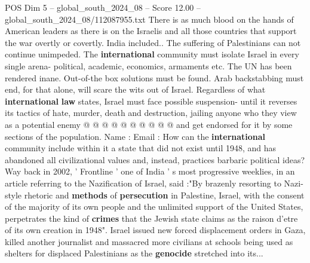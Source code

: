 \begin{textsample}{POS Dim 5 – global\_south\_2024\_08 – Score 12.00 – global\_south\_2024\_08/112087955.txt}
There is as much blood on the hands of American leaders as there is on the Israelis and all those countries that support the war overtly or covertly.
India included..
The suffering of Palestinians can not continue unimpeded.
The \textbf{international} community must isolate Israel in every single arena- political, academic, economics, armaments etc.
The UN has been rendered inane.
Out-of-the box solutions must be found.
Arab backstabbing must end, for that alone, will scare the wits out of Israel.
Regardless of what \textbf{international} \textbf{law} states, Israel must face possible suspension- until it reverses its tactics of hate, murder, death and destruction, jailing anyone who they view as a potential enemy @ @ @ @ @ @ @ @ @ @ and get endorsed for it by some sections of the population.
Name : Email : How can the \textbf{international} community include within it a state that did not exist until 1948, and has abandoned all civilizational values and, instead, practices barbaric political ideas?
Way back in 2002, ' Frontline ' one of India ' s most progressive weeklies, in an article referring to the Nazification of Israel, said :"By brazenly resorting to Nazi-style rhetoric and \textbf{methods} of \textbf{persecution} in Palestine, Israel, with the consent of the majority of its own people and the unlimited support of the United States, perpetrates the kind of \textbf{crimes} that the Jewish state claims as the raison d'etre of its own creation in 1948".
Israel issued new forced displacement orders in Gaza, killed another journalist and massacred more civilians at schools being used as shelters for displaced Palestinians as the \textbf{genocide} stretched into its...

\end{textsample}
